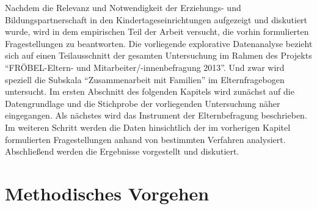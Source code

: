 \documentclass[12pt,a4paper]{article}
\begin{document}
Nachdem die Relevanz und Notwendigkeit der Erziehungs- und Bildungspartnerschaft in den Kindertageseinrichtungen aufgezeigt und diskutiert wurde, wird in dem empirischen Teil der Arbeit versucht, die vorhin formulierten Fragestellungen zu beantworten. Die vorliegende explorative Datenanalyse bezieht sich auf einen Teilausschnitt der gesamten Untersuchung im Rahmen des Projekts "`FRÖBEL-Eltern- und Mitarbeiter/-innenbefragung 2013"'. Und zwar   wird speziell die Subskala "`Zusammenarbeit mit Familien"' im Elternfragebogen untersucht.
	Im ersten Abschnitt des folgenden Kapitels wird zunächst auf die Datengrundlage und die Stichprobe der vorliegenden Untersuchung näher eingegangen. Als nächstes wird das Instrument der Elternbefragung beschrieben. Im weiteren Schritt werden die Daten hinsichtlich der im vorherigen Kapitel formulierten Fragestellungen anhand von bestimmten Verfahren analysiert. Abschließend werden die Ergebnisse vorgestellt und diskutiert.
 
\section{Methodisches Vorgehen}  
\end{document}
